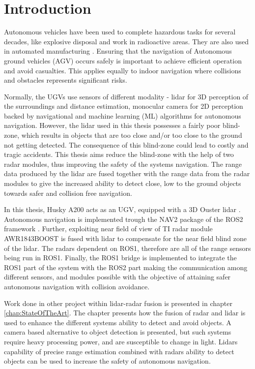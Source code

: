 \chapter{Introduction}
Autonomous vehicles have been used to complete hazardous tasks for several decades, like explosive disposal and work in radioactive areas. They are also used in automated manufacturing \cite{book}. Ensuring that the navigation of Autonomous ground vehicles (AGV) occurs safely is important to achieve efficient operation and avoid casualties. This applies equally to indoor navigation where collisions and obstacles represents significant risks. 

Normally, the UGVs use sensors of different modality - lidar for 3D perception of the surroundings and distance estimation, monocular camera for 2D perception backed by navigational and machine learning (ML) algorithms for autonomous navigation. However, the lidar used in this thesis possesses a fairly poor blind-zone, which results in objects that are too close and/or too close to the ground not getting detected. The consequence of this blind-zone could lead to costly and tragic accidents. This thesis aims reduce the blind-zone with the help of two radar modules, thus improving the safety of the systems navigation. The range data produced by the lidar are fused together with the range data from the radar modules to give the increased ability to detect close, low to the ground objects towards safer and collision free navigation.

In this thesis, Husky A200 \cite{husky-ugv} acts as an UGV, equipped with a 3D Ouster lidar \cite{ousterOS1datasheet}. Autonomous navigation is implemented trough the NAV2 package of the ROS2 framework \cite{doi:10.1126/scirobotics.abm6074}. Further, exploiting near field of view of TI radar module AWR1843BOOST \cite{awr1843boostintro} is fused with lidar to compensate for the near field blind zone of the lidar. The radars dependent on ROS1, therefore are all of the range sensors being run in ROS1. Finally, the ROS1 bridge is implemented to integrate the ROS1 part of the system with the ROS2 part making the communication among different sensors, and modules possible with the objective of attaining safer autonomous navigation with collision avoidance.

Work done in other project within lidar-radar fusion is presented in chapter \ref{chap:StateOfTheArt}. The chapter presents how the fusion of radar and lidar is used to enhance the different systems ability to detect and avoid objects. A camera based alternative to object detection is presented, but such systems require heavy processing power, and are susceptible to change in light. Lidars capability of precise range estimation combined with radars ability to detect objects can be used to increase the safety of autonomous navigation.

